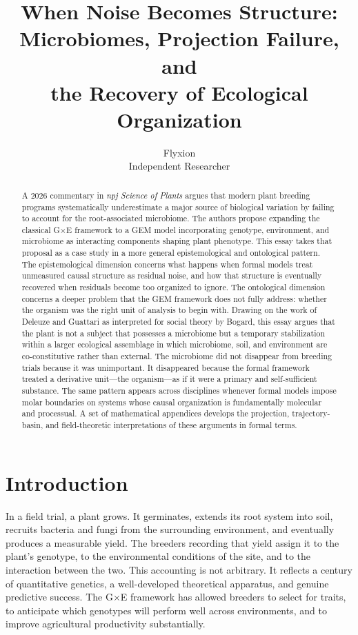 \documentclass[11pt, a4paper]{article}
\title{\textbf{When Noise Becomes Structure:\\
Microbiomes, Projection Failure, and\\
the Recovery of Ecological Organization}}
\author{Flyxion \\ \small Independent Researcher}
\date{}
\begin{document}
\maketitle

\begin{abstract}
\noindent
A 2026 commentary in \textit{npj Science of Plants} argues that modern plant breeding programs systematically underestimate a major source of biological variation by failing to account for the root-associated microbiome. The authors propose expanding the classical G$\times$E framework to a GEM model incorporating genotype, environment, and microbiome as interacting components shaping plant phenotype. This essay takes that proposal as a case study in a more general epistemological and ontological pattern. The epistemological dimension concerns what happens when formal models treat unmeasured causal structure as residual noise, and how that structure is eventually recovered when residuals become too organized to ignore. The ontological dimension concerns a deeper problem that the GEM framework does not fully address: whether the organism was the right unit of analysis to begin with. Drawing on the work of Deleuze and Guattari as interpreted for social theory by Bogard, this essay argues that the plant is not a subject that possesses a microbiome but a temporary stabilization within a larger ecological assemblage in which microbiome, soil, and environment are co-constitutive rather than external. The microbiome did not disappear from breeding trials because it was unimportant. It disappeared because the formal framework treated a derivative unit---the organism---as if it were a primary and self-sufficient substance. The same pattern appears across disciplines whenever formal models impose molar boundaries on systems whose causal organization is fundamentally molecular and processual. A set of mathematical appendices develops the projection, trajectory-basin, and field-theoretic interpretations of these arguments in formal terms.
\end{abstract}

\newpage

\vspace{1em}

\section{Introduction}

In a field trial, a plant grows. It germinates, extends its root system into soil, recruits bacteria and fungi from the surrounding environment, and eventually produces a measurable yield. The breeders recording that yield assign it to the plant's genotype, to the environmental conditions of the site, and to the interaction between the two. This accounting is not arbitrary. It reflects a century of quantitative genetics, a well-developed theoretical apparatus, and genuine predictive success. The G$\times$E framework has allowed breeders to select for traits, to anticipate which genotypes will perform well across environments, and to improve agricultural productivity substantially.
\end{document}
